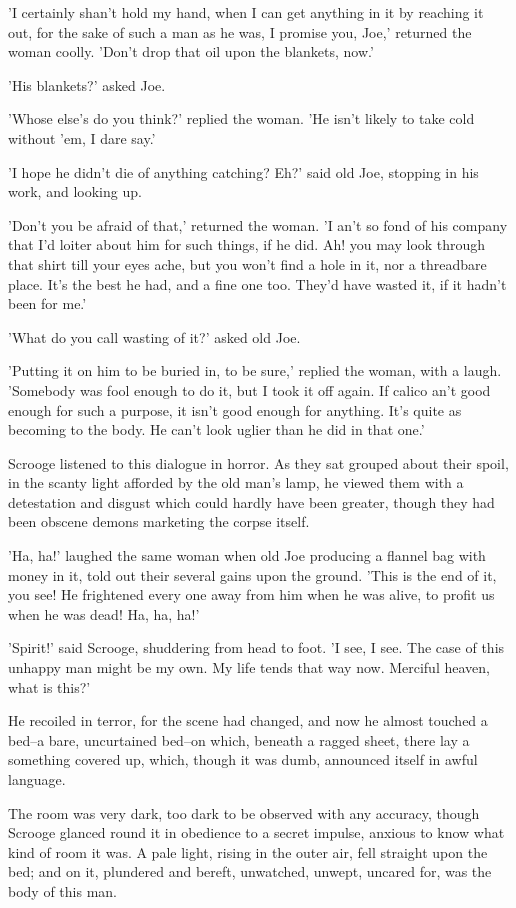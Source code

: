 'I certainly shan't hold my hand, when I can get anything in it by
reaching it out, for the sake of such a man as he was, I promise you,
Joe,' returned the woman coolly. 'Don't drop that oil upon the blankets,
now.'

'His blankets?' asked Joe.

'Whose else's do you think?' replied the woman. 'He isn't likely to take
cold without 'em, I dare say.'

'I hope he didn't die of anything catching? Eh?' said old Joe, stopping
in his work, and looking up.

'Don't you be afraid of that,' returned the woman. 'I an't so fond of
his company that I'd loiter about him for such things, if he did. Ah!
you may look through that shirt till your eyes ache, but you won't find
a hole in it, nor a threadbare place. It's the best he had, and a fine
one too. They'd have wasted it, if it hadn't been for me.'

'What do you call wasting of it?' asked old Joe.

'Putting it on him to be buried in, to be sure,' replied the woman, with
a laugh. 'Somebody was fool enough to do it, but I took it off again. If
calico an't good enough for such a purpose, it isn't good enough for
anything. It's quite as becoming to the body. He can't look uglier than
he did in that one.'

Scrooge listened to this dialogue in horror. As they sat grouped about
their spoil, in the scanty light afforded by the old man's lamp, he
viewed them with a detestation and disgust which could hardly have been
greater, though they had been obscene demons marketing the corpse
itself.

'Ha, ha!' laughed the same woman when old Joe producing a flannel bag
with money in it, told out their several gains upon the ground. 'This
is the end of it, you see! He frightened every one away from him when he
was alive, to profit us when he was dead! Ha, ha, ha!'

'Spirit!' said Scrooge, shuddering from head to foot. 'I see, I see. The
case of this unhappy man might be my own. My life tends that way now.
Merciful heaven, what is this?'

He recoiled in terror, for the scene had changed, and now he almost
touched a bed--a bare, uncurtained bed--on which, beneath a ragged
sheet, there lay a something covered up, which, though it was dumb,
announced itself in awful language.

The room was very dark, too dark to be observed with any accuracy,
though Scrooge glanced round it in obedience to a secret impulse,
anxious to know what kind of room it was. A pale light, rising in the
outer air, fell straight upon the bed; and on it, plundered and bereft,
unwatched, unwept, uncared for, was the body of this man.

